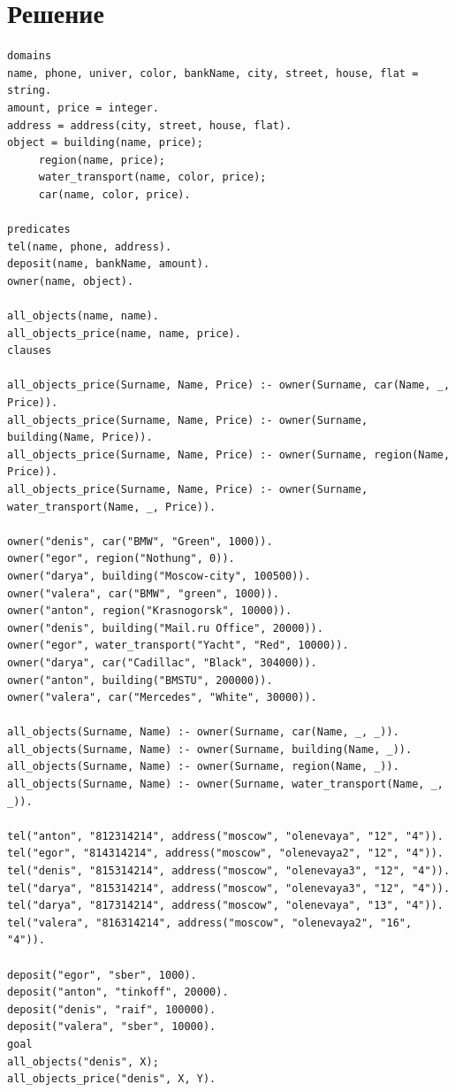 \documentclass[12pt]{report}
\begin{document}
\chapter*{Решение}
\begin{lstlisting}
domains
name, phone, univer, color, bankName, city, street, house, flat = string.
amount, price = integer.
address = address(city, street, house, flat).
object = building(name, price);
	 region(name, price);
	 water_transport(name, color, price);
	 car(name, color, price).

predicates
tel(name, phone, address).
deposit(name, bankName, amount).
owner(name, object).

all_objects(name, name).
all_objects_price(name, name, price).
clauses

all_objects_price(Surname, Name, Price) :- owner(Surname, car(Name, _, Price)).
all_objects_price(Surname, Name, Price) :- owner(Surname, building(Name, Price)).
all_objects_price(Surname, Name, Price) :- owner(Surname, region(Name, Price)).
all_objects_price(Surname, Name, Price) :- owner(Surname, water_transport(Name, _, Price)).

owner("denis", car("BMW", "Green", 1000)).
owner("egor", region("Nothung", 0)).
owner("darya", building("Moscow-city", 100500)).
owner("valera", car("BMW", "green", 1000)).
owner("anton", region("Krasnogorsk", 10000)).
owner("denis", building("Mail.ru Office", 20000)).
owner("egor", water_transport("Yacht", "Red", 10000)).
owner("darya", car("Cadillac", "Black", 304000)).
owner("anton", building("BMSTU", 200000)).
owner("valera", car("Mercedes", "White", 30000)).

all_objects(Surname, Name) :- owner(Surname, car(Name, _, _)).
all_objects(Surname, Name) :- owner(Surname, building(Name, _)).
all_objects(Surname, Name) :- owner(Surname, region(Name, _)).
all_objects(Surname, Name) :- owner(Surname, water_transport(Name, _, _)).

tel("anton", "812314214", address("moscow", "olenevaya", "12", "4")).
tel("egor", "814314214", address("moscow", "olenevaya2", "12", "4")).
tel("denis", "815314214", address("moscow", "olenevaya3", "12", "4")).
tel("darya", "815314214", address("moscow", "olenevaya3", "12", "4")).
tel("darya", "817314214", address("moscow", "olenevaya", "13", "4")).
tel("valera", "816314214", address("moscow", "olenevaya2", "16", "4")).

deposit("egor", "sber", 1000).
deposit("anton", "tinkoff", 20000).
deposit("denis", "raif", 100000).
deposit("valera", "sber", 10000).
goal
all_objects("denis", X);
all_objects_price("denis", X, Y).
\end{lstlisting}
\end{document}
